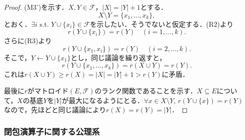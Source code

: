 \documentclass[xelatex,ja=standard,a4paper,14pt,everyparhook=compat]{bxjsarticle}
\theoremstyle{definition}
\begin{document}
\begin{proof}
    (M3')を示す．$X, Y \in \mathcal{F}$，$|X| = |Y| + 1$とする．\begin{equation*}
        X \setminus Y = \{x_1, \ldots, x_k\},
    \end{equation*}
    とおく．$\exists i$ s.t. $Y \cup \{x_i\} \in \mathcal{F}$を示したい．そうでないと仮定する．(R2)より \begin{equation*}
        r(Y \cup \{x_i\}) = r(Y) \quad (i = 1, \ldots, k).
    \end{equation*}
    さらに(R3)より \begin{equation*}
        r(Y \cup \{x_1, x_i\}) = r(Y) \quad (i = 2, \ldots, k).
    \end{equation*}
    そこで，$Y \gets Y \cup \{x_1\}$とし，同じ議論を繰り返すと， \begin{equation*}
        r(Y \cup \{x_1, \ldots, x_k\}) = r(X \cup Y) = r(Y).
    \end{equation*}
    これは$r(X \cup Y) \geq r(X) = |X| = |Y| + 1 > r(Y)$に矛盾．

    \newpage

    最後に$r$がマトロイド$(E, \mathcal{F})$のランク関数であることを示す．$X \subseteq E$について，$X$の基底$Y$を$|Y|$が最大になるようにとる．$\forall x \in X \setminus Y$, $r(Y \cup \{x\}) = r(Y)$なので，先ほどと同じ議論により$r(X) = r(Y) = |Y|$．
\end{proof}

\subsubsection*{閉包演算子に関する公理系}
\end{document}
